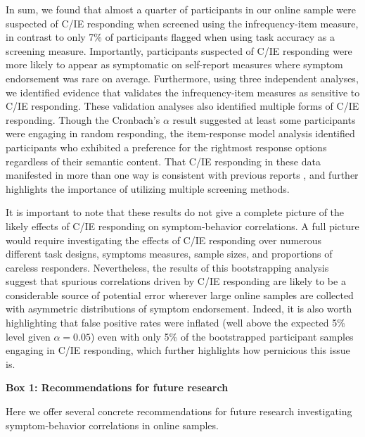 \documentclass[a4paper,notitlepage,12pt]{article}
\begin{document}
In sum, we found that almost a quarter of participants in our online sample were suspected of C/IE responding when screened using the infrequency-item measure, in contrast to only 7\% of participants flagged when using task accuracy as a screening measure. Importantly, participants suspected of C/IE responding were more likely to appear as symptomatic on self-report measures where symptom endorsement was rare on average. Furthermore, using three independent analyses, we identified evidence that validates the infrequency-item measures as sensitive to C/IE responding. These validation analyses also identified multiple forms of C/IE responding. Though the Cronbach's $\alpha$ result suggested at least some participants were engaging in random responding, the item-response model analysis identified participants who exhibited a preference for the rightmost response options regardless of their semantic content. That C/IE responding in these data manifested in more than one way is consistent with previous reports \cite{curran2016methods}, and further highlights the importance of utilizing multiple screening methods.

It is important to note that these results do not give a complete picture of the likely effects of C/IE responding on symptom-behavior correlations. A full picture would require investigating the effects of C/IE responding over numerous different task designs, symptoms measures, sample sizes, and proportions of careless responders. Nevertheless, the results of this bootstrapping analysis suggest that spurious correlations driven by C/IE responding are likely to be a considerable source of potential error wherever large online samples are collected with asymmetric distributions of symptom endorsement. Indeed, it is also worth highlighting that false positive rates were inflated (well above the expected 5\% level given $\alpha = 0.05$) even with only 5\% of the bootstrapped participant samples engaging in C/IE responding, which further highlights how pernicious this issue is.

\newpage
\textbf{Box 1: Recommendations for future research}

Here we offer several concrete recommendations for future research investigating symptom-behavior correlations in online samples.
\end{document}
